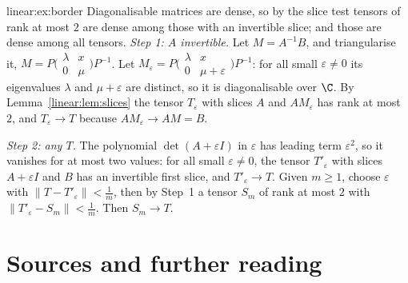 \begin{solution}{linear:ex:border}
\idea Diagonalisable matrices are dense, so by the slice test tensors of rank at most $2$ are dense among those with an
invertible slice; and those are dense among all tensors.
\writeup \emph{Step 1: $A$ invertible.} Let $M=A^{-1}B$, and triangularise it, $M=P\bigl(\begin{smallmatrix}\lambda&x\\0&\mu\end{smallmatrix}
\bigr)P^{-1}$. Let $M_\varepsilon=P\bigl(\begin{smallmatrix}\lambda&x\\0&\mu+\varepsilon\end{smallmatrix}\bigr)P^{-1}$: for all small
$\varepsilon\ne0$ its eigenvalues $\lambda$ and $\mu+\varepsilon$ are distinct, so it is diagonalisable over $\C$. By
Lemma~\ref{linear:lem:slices} the tensor $T_\varepsilon$ with slices $A$ and $AM_\varepsilon$ has rank at most $2$, and $T_\varepsilon\to T$
because $AM_\varepsilon\to AM=B$.

\emph{Step 2: any $T$.} The polynomial $\det(A+\varepsilon I)$ in $\varepsilon$ has leading term $\varepsilon^2$, so it vanishes for at
most two values: for all small $\varepsilon\ne0$, the tensor $T'_\varepsilon$ with slices $A+\varepsilon I$ and $B$ has an invertible
first slice, and $T'_\varepsilon\to T$. Given $m\ge1$, choose $\varepsilon$ with $\|T-T'_\varepsilon\|<\frac1m$, then by Step~1 a tensor
$S_m$ of rank at most $2$ with $\|T'_\varepsilon-S_m\|<\frac1m$. Then $S_m\to T$.
\end{solution}

\section*{Sources and further reading}

